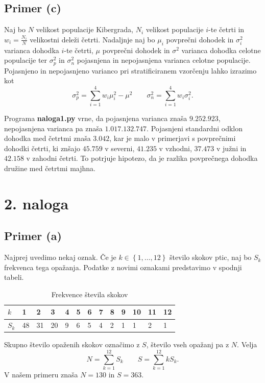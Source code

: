 \documentclass[a4paper,11pt]{article}
\newcommand{\set}[1]{\left\{#1\right\}} %
\begin{document}
\subsection*{Primer (c)}

Naj bo $N$ velikost populacije Kibergrada, $N_i$ velikost populacije $i$-te četrti in $w_i = \frac{N_i}{N}$ velikostni deleži četrti.
Nadaljnje naj bo $\mu_i$ povprečni dohodek in $\sigma_i^2$ varianca dohodka $i$-te četrti,
$\mu$ povprečni dohodek in $\sigma^2$ varianca dohodka celotne populacije ter $\sigma^2_p$ in $\sigma^2_n$ pojasnjena in nepojasnjena varianca celotne populacije.
Pojasnjeno in nepojasnjeno varianco pri stratificiranem vzorčenju lahko izrazimo kot
\[\sigma^2_p = \sum_{i=1}^4 w_i \mu_i^2 - \mu^2 \qquad \sigma^2_n = \sum_{i=1}^4 w_i \sigma_i^2.\]

Programa \textbf{naloga1.py} vrne, da pojasnjena varianca znaša $9.252.923$, nepojasnjena varianca pa znaša $1.017.132.747$.
Pojasnjeni standardni odklon dohodka med četrtmi znaša $3.042$, kar je malo v primerjavi s povprečnimi dohodki četrti,
ki znšajo $45.759$ v severni, $41.235$ v vzhodni, $37.473$ v južni in $42.158$ v zahodni četrti.
To potrjuje hipotezo, da je razlika povprečnega dohodka družine med četrtmi majhna.


\section*{2. naloga}

\subsection*{Primer (a)}

Najprej uvedimo nekaj oznak. 
Če je $k \in \set{1, \ldots, 12}$ število skokov ptic, naj bo $S_k$ frekvenca tega opažanja.
Podatke z novimi oznakami predstavimo v spodnji tabeli.
\begin{table}[H]
    \centering
    \begin{tabular}{|l|l|l|l|l|l|l|l|l|l|l|l|l|}
    \hline
    $k$ & 1 & 2 & 3 & 4 & 5 & 6 & 7 & 8 & 9 & 10 & 11 & 12 \\ \hline
    $S_k$ & 48 & 31 & 20 & 9 & 6 & 5 & 4 & 2 & 1 & 1 & 2 & 1 \\ \hline
    \end{tabular}
    \caption{Frekvence števila skokov}
    \label{freq}
\end{table}
\noindent Skupno število opaženih skokov označimo z $S$, število vseh opažanj pa z $N$.
Velja
\[N = \sum_{k=1}^{12} S_k \qquad S = \sum_{k=1}^{12} k S_k.\]
V našem primeru znaša $N = 130$ in $S = 363$.
\end{document}
